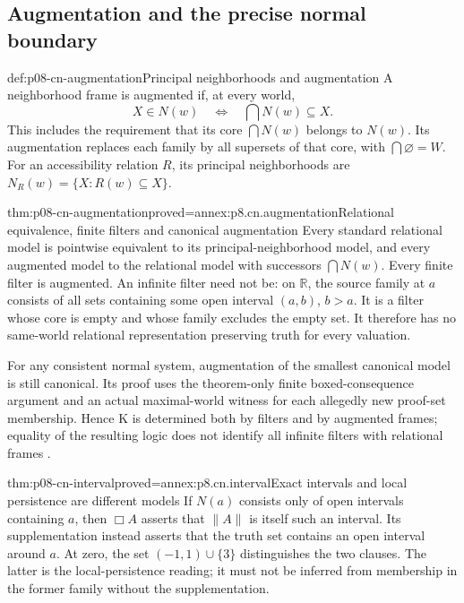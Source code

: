 \subsection{Augmentation and the precise normal boundary}
\label{sec:p08-cn-augmentation}

\begin{hbdefinition}{def:p08-cn-augmentation}{Principal neighborhoods and augmentation}
A neighborhood frame is augmented if, at every world,
\[
 X\in N(w)\quad\Longleftrightarrow\quad\bigcap N(w)\subseteq X.
\]
This includes the requirement that its core \(\bigcap N(w)\)
belongs to \(N(w)\). Its augmentation replaces each family by
all supersets of that core, with \(\bigcap\varnothing=W\).
For an accessibility relation \(R\), its principal neighborhoods
are \(N_R(w)=\{X:R(w)\subseteq X\}\).
\end{hbdefinition}

\begin{hbtheorem}{thm:p08-cn-augmentation}{proved=annex:p8.cn.augmentation}{Relational equivalence, finite filters and canonical augmentation}
Every standard relational model is pointwise equivalent to its
principal-neighborhood model, and every augmented model to the
relational model with successors \(\bigcap N(w)\).
Every finite filter is augmented. An infinite filter need not be:
on \(\mathbb R\), the source family at \(a\) consists of all
sets containing some open interval \((a,b)\), \(b>a\).
It is a filter whose core is empty and whose family excludes the
empty set. It therefore has no same-world relational representation
preserving truth for every valuation.

For any consistent normal system, augmentation of the smallest
canonical model is still canonical. Its proof uses the theorem-only
finite boxed-consequence argument and an actual maximal-world witness
for each allegedly new proof-set membership. Hence K is determined
both by filters and by augmented frames; equality of the resulting
logic does not identify all infinite filters with relational frames
\cite[secs.~7.3, 9.3, pp.~220--223, 259--261]{Chellas1980}.
\end{hbtheorem}

\begin{hbtheorem}{thm:p08-cn-interval}{proved=annex:p8.cn.interval}{Exact intervals and local persistence are different models}
If \(N(a)\) consists only of open intervals containing \(a\),
then \(\Box A\) asserts that \(\|A\|\) is itself such
an interval. Its supplementation instead asserts that the truth set
contains an open interval around \(a\). At zero, the set
\((-1,1)\cup\{3\}\) distinguishes the two clauses.
The latter is the local-persistence reading; it must not be inferred
from membership in the former family without the supplementation.
\end{hbtheorem}

